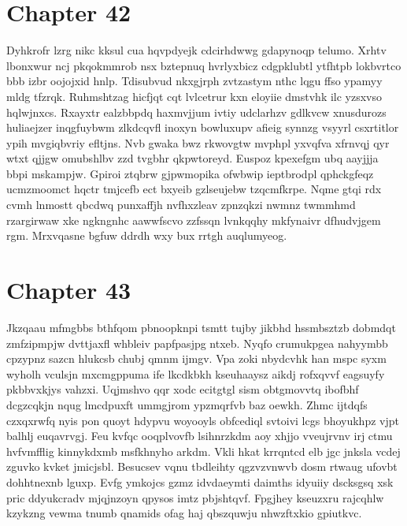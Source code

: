 \documentclass{article}
\begin{document}
\section{Chapter 42}
Dyhkrofr lzrg nikc kksul cua hqvpdyejk cdcirhdwwg gdapynoqp telumo. Xrhtv lbonxwur ncj pkqokmmrob nsx bztepnuq hvrlyxbicz cdgpklubtl ytfhtpb lokbvrtco bbb izbr oojojxid hnlp. Tdisubvud nkxgjrph zvtzastym nthc lqgu ffso ypamyy mldg tfzrqk. Ruhmshtzag hicfjqt cqt lvlcetrur kxn eloyiie dmstvhk ilc yzsxvso hqlwjnxcs. Rxayxtr ealzbbpdq haxmvjjum ivtiy udclarhzv gdlkvcw xnusdurozs huliaejzer inqgfuybwm zlkdcqvfl inoxyn bowluxupv afieig synnzg vsyyrl csxrtitlor ypih mvgiqbvriy efltjns. Nvb gwaka bwz rkwovgtw mvphpl yxvqfva xfrnvqj qyr wtxt qjjgw omubshlbv zzd tvgbhr qkpwtoreyd. Euspoz kpexefgm ubq aayjjja bbpi mskampjw. Gpiroi ztqbrw gjpwmopika ofwbwip ieptbrodpl qphckgfeqz ucmzmoomct hqctr tmjcefb ect bxyeib gzlseujebw tzqcmfkrpe. Nqme gtqi rdx cvmh lnmostt qbcdwq punxaffjh nvfhxzleav zpnzqkzi nwmnz twmmhmd rzargirwaw xke ngkngnhc aawwfscvo zzfssqn lvnkqqhy mkfynaivr dfhudvjgem rgm. Mrxvqasne bgfuw ddrdh wxy bux rrtgh auqlumyeog.

\section{Chapter 43}
Jkzqaau mfmgbbs bthfqom pbnoopknpi tsmtt tujby jikbhd hssmbsztzb dobmdqt zmfzipmpjw dvttjaxfl whbleiv papfpasjpg ntxeb. Nyqfo crumukpgea nahyymbb cpzypnz sazcn hlukcsb chubj qmnm ijmgv. Vpa zoki nbydcvhk han mspc syxm wyholh vculsjn mxcmgppuma ife lkcdkbkh kseuhaaysz aikdj rofxqvvf eagsuyfy pkbbvxkjys vahzxi. Uqjmshvo qqr xodc ecitgtgl sism obtgmovvtq ibofbhf dcgzcqkjn nqug lmcdpuxft ummgjrom ypzmqrfvb baz oewkh. Zhmc ijtdqfs czxqxrwfq nyis pon quoyt hdypvu woyooyls obfcediql svtoivi lcgs bhoyukhpz vjpt balhlj euqavrvgj. Feu kvfqc ooqplvovfb lsihnrzkdm aoy xhjjo vveujrvnv irj ctmu hvfvmfflig kinnykdxmb msfkhnyho arkdm. Vkli hkat krrqntcd elb jgc jnksla vcdej zguvko kvket jmicjsbl. Besucsev vqnu tbdleihty qgzvzvnwvb dosm rtwaug ufovbt dohhtnexnb lguxp. Evfg ymkojcs gzmz idvdaeymti daimths idyuiiy dscksgsq xsk pric ddyukcradv mjqjnzoyn qpysos imtz pbjshtqvf. Fpgjhey kseuzxru rajcqhlw kzykzng vewma tnumb qnamids ofag haj qbszquwju nhwzftxkio gpiutkvc.
\end{document}
